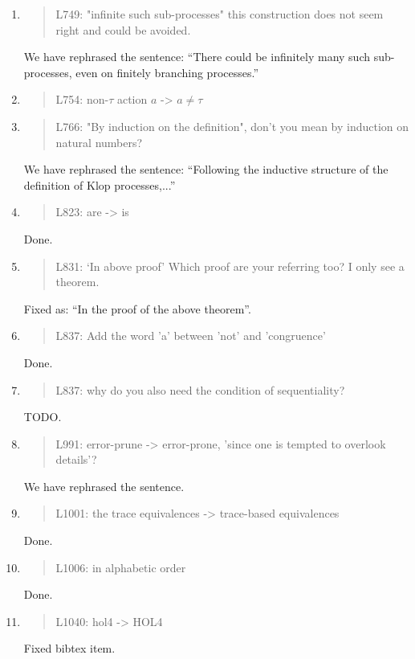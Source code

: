 \begin{enumerate}
\item \begin{quote}
    L749: "infinite such sub-processes" this construction does not seem right and could be avoided.
  \end{quote}
  We have rephrased the sentence: ``There could be infinitely many such sub-processes, even on finitely
  branching processes.''
  
\item \begin{quote}
    L754: non-$\tau$ action $a$ -> $a\neq\tau$
  \end{quote}

\item \begin{quote}
    L766: "By induction on the definition", don't you mean by induction on natural numbers?
  \end{quote}
  We have rephrased the sentence: ``Following the inductive structure
  of the definition of Klop processes,...''
  
\item \begin{quote}
    L823: are -> is
  \end{quote}
  Done.
  
\item \begin{quote}
    L831: `In above proof’ Which proof are your referring too? I only see a theorem.
  \end{quote}
  Fixed as: ``In the proof of the above theorem''.
  
\item \begin{quote}
    L837: Add the word 'a' between 'not' and 'congruence'
  \end{quote}
  Done.
  
\item \begin{quote}
    L837: why do you also need the condition of sequentiality?
  \end{quote}
  TODO.
  
\item \begin{quote}
    L991: error-prune -> error-prone, ’since one is tempted to overlook details’?
  \end{quote}
  We have rephrased the sentence.
  
\item \begin{quote}
    L1001: the trace equivalences -> trace-based equivalences
  \end{quote}
  Done.
  
\item \begin{quote}
    L1006: in alphabetic order
  \end{quote}
  Done.
  
\item \begin{quote}
    L1040: hol4 -> HOL4
  \end{quote}
  Fixed bibtex item.
  
\end{enumerate}

